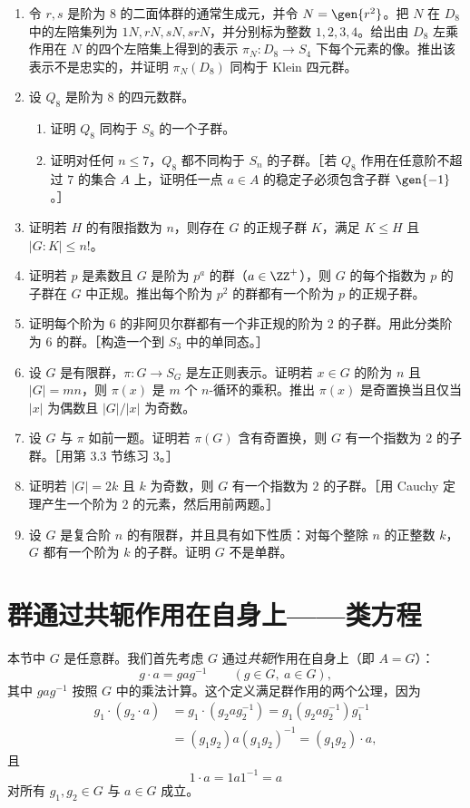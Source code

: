 \begin{enumerate}[label=\arabic*.]
\begin{enumerate}[label=(\alph*)]
  \end{enumerate}
  \item 令 $r,s$ 是阶为 $8$ 的二面体群的通常生成元，并令 $N=\gen{r^2}$。把 $N$ 在 $D_8$ 中的左陪集列为 $1N,rN,sN,srN$，并分别标为整数 $1,2,3,4$。给出由 $D_8$ 左乘作用在 $N$ 的四个左陪集上得到的表示 $\pi_N:D_8\to S_4$ 下每个元素的像。推出该表示不是忠实的，并证明 $\pi_N(D_8)$ 同构于 Klein 四元群。
  \item 设 $Q_8$ 是阶为 $8$ 的四元数群。
  \begin{enumerate}[label=(\alph*)]
    \item 证明 $Q_8$ 同构于 $S_8$ 的一个子群。
    \item 证明对任何 $n\leq7$，$Q_8$ 都不同构于 $S_n$ 的子群。［若 $Q_8$ 作用在任意阶不超过 $7$ 的集合 $A$ 上，证明任一点 $a\in A$ 的稳定子必须包含子群 $\gen{-1}$。］
  \end{enumerate}
  \item 证明若 $H$ 的有限指数为 $n$，则存在 $G$ 的正规子群 $K$，满足 $K\leq H$ 且 $|G:K|\leq n!$。
  \item 证明若 $p$ 是素数且 $G$ 是阶为 $p^a$ 的群（$a\in\ZZ^+$），则 $G$ 的每个指数为 $p$ 的子群在 $G$ 中正规。推出每个阶为 $p^2$ 的群都有一个阶为 $p$ 的正规子群。
  \item 证明每个阶为 $6$ 的非阿贝尔群都有一个非正规的阶为 $2$ 的子群。用此分类阶为 $6$ 的群。［构造一个到 $S_3$ 中的单同态。］
  \item 设 $G$ 是有限群，$\pi:G\to S_G$ 是左正则表示。证明若 $x\in G$ 的阶为 $n$ 且 $|G|=mn$，则 $\pi(x)$ 是 $m$ 个 $n$-循环的乘积。推出 $\pi(x)$ 是奇置换当且仅当 $|x|$ 为偶数且 $|G|/|x|$ 为奇数。
  \item 设 $G$ 与 $\pi$ 如前一题。证明若 $\pi(G)$ 含有奇置换，则 $G$ 有一个指数为 $2$ 的子群。［用第 3.3 节练习 3。］
  \item 证明若 $|G|=2k$ 且 $k$ 为奇数，则 $G$ 有一个指数为 $2$ 的子群。［用 Cauchy 定理产生一个阶为 $2$ 的元素，然后用前两题。］
  \item 设 $G$ 是复合阶 $n$ 的有限群，并且具有如下性质：对每个整除 $n$ 的正整数 $k$，$G$ 都有一个阶为 $k$ 的子群。证明 $G$ 不是单群。
\end{enumerate}

\section{群通过共轭作用在自身上——类方程}

本节中 $G$ 是任意群。我们首先考虑 $G$ 通过\emph{共轭}作用在自身上（即 $A=G$）：
\[
  g\cdot a=gag^{-1}
  \qquad (g\in G,
\ a\in G),
\]
其中 $gag^{-1}$ 按照 $G$ 中的乘法计算。这个定义满足群作用的两个公理，因为
\begin{align*}
  g_1\cdot(g_2\cdot a)
  &=g_1\cdot(g_2ag_2^{-1})
    =g_1(g_2ag_2^{-1})g_1^{-1}\\
  &=(g_1g_2)a(g_1g_2)^{-1}
    =(g_1g_2)\cdot a,
\end{align*}
且
\[
  1\cdot a=1a1^{-1}=a
\]
对所有 $g_1,g_2\in G$ 与 $a\in G$ 成立。

